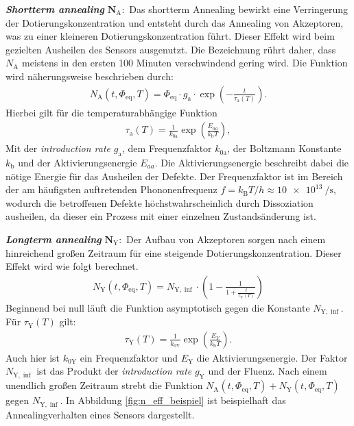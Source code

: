 \textbf{\textit{Shortterm annealing}} $\symbf{N_{\mathrm{A}}}:$ Das shortterm Annealing bewirkt eine Verringerung der Dotierungskonzentration und entsteht durch
das Annealing von Akzeptoren, was zu einer kleineren Dotierungskonzentration führt. Dieser Effekt wird beim
gezielten Ausheilen des Sensors ausgenutzt. Die Bezeichnung rührt daher, dass $N_{\mathrm{A}}$ meistens in den ersten 100 Minuten verschwindend gering wird. Die
Funktion wird näherungsweise beschrieben durch:
\begin{align}
  N_{\mathrm{A}}(t, \Phi_{\mathrm{eq}}, T) = \Phi_{\mathrm{eq}} \cdot g_{\mathrm{a}} \cdot \exp{\left(-\frac{t}{\tau_{\mathrm{a}}(T)}\right)}.
\end{align}
Hierbei gilt für die temperaturabhängige Funktion
\begin{align}
  \tau_{\mathrm{a}}(T) = \frac{1}{k_{0\mathrm{a}}}\exp{\left(\frac{E_{aa}}{k_{\mathrm{b}}T}\right)},
\end{align}
Mit der \textit{introduction rate} $g_{\mathrm{a}}$, dem Frequenzfaktor $k_{0\mathrm{a}}$, der Boltzmann Konstante $k_{\mathrm{b}}$ und
der Aktivierungsenergie $E_{aa}$. Die Aktivierungsenergie beschreibt dabei die nötige Energie für das Ausheilen der Defekte.
Der Frequenzfaktor ist im Bereich der am häufigsten auftretenden Phononenfrequenz ${f = k_{\mathrm{B}}T/h \approx \SI{10e13}{\per\second}}$, wodurch
die betroffenen Defekte höchstwahrscheinlich durch Dissoziation ausheilen, da dieser ein Prozess mit einer einzelnen Zustandsänderung ist.


\textbf{\textit{Longterm annealing}} $\symbf{N_{\mathrm{Y}}}:$ Der Aufbau von
Akzeptoren sorgen nach einem hinreichend großen Zeitraum für eine steigende
Dotierungskonzentration. Dieser Effekt wird wie folgt berechnet.
\begin{align}
  N_{\mathrm{Y}}(t, \Phi_{\mathrm{eq}}, T)     = N_{\mathrm{Y , \inf}}\cdot \left(1 - \frac{1}{1 + \frac{t}{\tau_{\mathrm{Y}}(T)}}\right)
\end{align}
Beginnend bei null läuft die Funktion asymptotisch gegen die Konstante $N_{\mathrm{Y, \inf}}$.
Für $\tau_{\mathrm{Y}}(T)$ gilt:
\begin{align}
  \tau_{\mathrm{Y}}(T) = \frac{1}{k_{0\mathrm{Y}}}\exp{\left(\frac{E_{Y}}{k_{\mathrm{b}}T}\right)}.
\end{align}
Auch hier ist $k_{0\mathrm{Y}}$ ein Frequenzfaktor und $E_{\mathrm{Y}}$ die Aktivierungsenergie. Der Faktor $N_{\mathrm{Y , \inf}}$
ist das Produkt der \textit{introduction rate} $g_{\mathrm{Y}}$ und der Fluenz. Nach einem unendlich großen Zeitraum strebt
die Funktion $N_{\mathrm{A}}(t, \Phi_{\mathrm{eq}}, T) + N_{\mathrm{Y}}(t, \Phi_{\mathrm{eq}}, T)$ gegen $N_{\mathrm{Y , \inf}}$.
In Abbildung \ref{fig:n_eff_beispiel} ist beispielhaft das Annealingverhalten eines
Sensors dargestellt.

